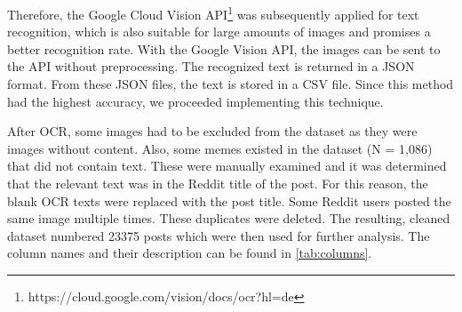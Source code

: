 \documentclass[11pt,a4paper]{article}
\begin{document}
Therefore, the Google Cloud Vision API\footnote{https://cloud.google.com/vision/docs/ocr?hl=de}
was subsequently applied for text recognition, which is also suitable for large amounts of images and promises a better recognition rate. With the Google Vision API, the images can be sent to the API without preprocessing. The recognized text is returned in a JSON format. From these JSON files, the text is stored in a CSV file.  Since this method had the highest accuracy, we proceeded implementing this technique.
\par
After OCR, some images had to be excluded from the dataset as they were images without content. Also, some memes existed in the dataset (N = 1,086) that did not contain text. These were manually examined and it was determined that the relevant text was in the Reddit title of the post. For this reason, the blank OCR texts were replaced with the post title. Some Reddit users posted the same image multiple times. These duplicates were deleted. The resulting, cleaned dataset numbered 23375 posts which were then used for further analysis. The column names and their description can be found in \autoref{tab:columns}. 
\end{document}
